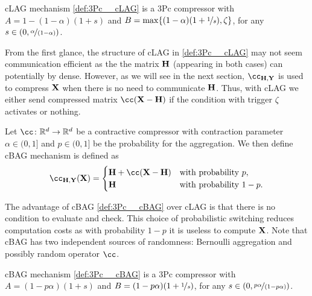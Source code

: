 \documentclass[11pt]{article}
\begin{document}
	\begin{lemma}
		cLAG mechanism \eqref{def:3Pc__cLAG} is a 3Pc compressor with $A = 1-(1-\alpha)(1+s)$ and $B = \max\{(1-\alpha)(1+\nicefrac{1}{s}),\zeta\}$, for any $s\in(0,\nicefrac{\alpha}{(1-\alpha)})$.
	\end{lemma}
	
	From the first glance, the structure of cLAG in \eqref{def:3Pc__cLAG} may not seem communication efficient as the the matrix $\mathbf{H}$ (appearing in both cases) can potentially by dense. However, as we will see in the next section, $\cc_{\mH,\mY}$ is used to compress $\mathbf{X}$ when there is no need to communicate $\mathbf{H}$. Thus, with cLAG we either send compressed matrix $\cc(\mX-\mH)$ if the condition with trigger $\zeta$ activates or nothing.
	
	\begin{example}\label{ex:cBAG}
		Let $\cc\colon\R^d\to\R^d$ be a contractive compressor with contraction parameter $\alpha\in(0,1]$ and $p\in(0,1]$ be the probability for the aggregation. We then define cBAG mechanism is defined as
		\begin{equation}\label{def:3Pc__cBAG}
			\cc_{\mH,\mY}(\mX) =
			\begin{cases}
				\mH + \cc(\mX-\mH) & \text{with probability } p,\\
				\mH & \text{with probability } 1-p.
			\end{cases}
		\end{equation}
	\end{example}
	
	The advantage of cBAG \eqref{def:3Pc__cBAG} over cLAG is that there is no condition to evaluate and check. This choice of probabilistic switching reduces computation costs as with probability $1-p$  it is useless to compute $\mathbf{X}$. Note that cBAG has two independent sources of randomness: Bernoulli aggregation and possibly random operator $\cc$.
	
	\begin{lemma}\label{lem:3Pc__cBAG}
		cBAG mechanism \eqref{def:3Pc__cBAG} is a 3Pc compressor with $A = (1-p\alpha)(1+s)$ and $B = (1-p\alpha)(1+\nicefrac{1}{s})$, for any $s\in(0,\nicefrac{p\alpha}{(1-p\alpha)})$.
	\end{lemma}
	
\end{document}
